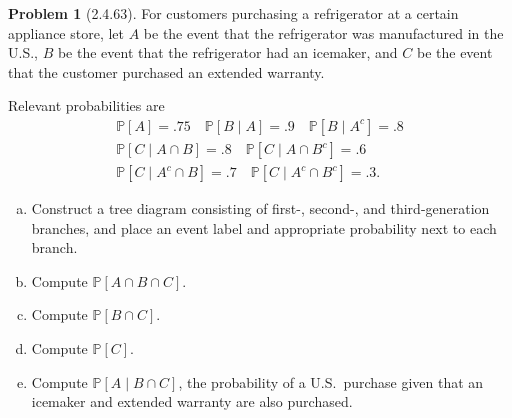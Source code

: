 \documentclass[10pt]{article}
\theoremstyle{definition}
\newtheorem{problem}[theorem]{Problem}
\newcommand{\1}[1]{\textbf{1}_{\left[#1\right]}} %
\def\P{\mathbb{P}} %
\begin{document}
\begin{problem}[2.4.63]
  For customers purchasing a refrigerator at a certain appliance store, let
  $A$ be the event that the refrigerator was manufactured in the U.S., $B$ be
  the event that the refrigerator had an icemaker, and $C$ be the event that the
  customer purchased an extended warranty.

  Relevant probabilities are
  \begin{gather*}
    \P\left[A \right] = .75 \quad \P\left[B\mid A \right] = .9 \quad \P\left[B\mid A^{c} \right]=.8\\
    \P\left[C\mid A\cap B \right] = .8 \quad \P\left[C\mid A\cap B^{c} \right] = .6\\
    \P\left[C\mid A^{c}\cap B \right]=.7 \quad \P\left[C\mid A^{c}\cap B^{c} \right]=.3.
  \end{gather*}
  \begin{enumerate}[(a)]
    \item Construct a tree diagram consisting of first-, second-, and
    third-generation branches, and place an event label and
    appropriate probability next to each branch.
    \item Compute $\P\left[A\cap B\cap C \right]$.
    \item Compute $\P\left[B\cap C \right]$.
    \item Compute $\P\left[C \right]$.
    \item Compute $\P\left[A\mid B\cap C \right]$, the probability of a
    U.S.~purchase given that an icemaker and extended warranty are also
    purchased.
  \end{enumerate}
\end{problem}
\end{document}
